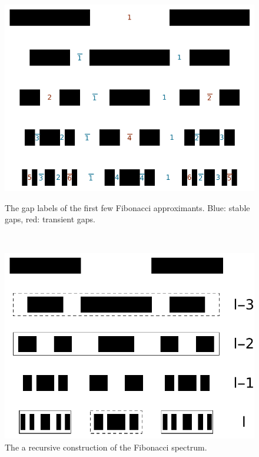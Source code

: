 \documentclass[a4paper]{jpconf}
\begin{document}
\begin{figure}[htp]
	\centering
	\begin{minipage}{0.4\textwidth}
		\centering
		\includegraphics[width=1.\textwidth]{gap_labels.pdf}
		\caption{\small {The gap labels of the first few Fibonacci approximants. Blue: stable gaps, red: transient gaps.}}
		\label{fig:fibogaps}
	\end{minipage}~~
	\begin{minipage}{0.4\textwidth}
		\centering
		\includegraphics[width=1.\textwidth]{recursive_construction_spectrum.pdf}
		\caption{\small{The a recursive construction of the Fibonacci spectrum.}}
		\label{fig:fibospec}
	\end{minipage}
\end{figure}
\end{document}
